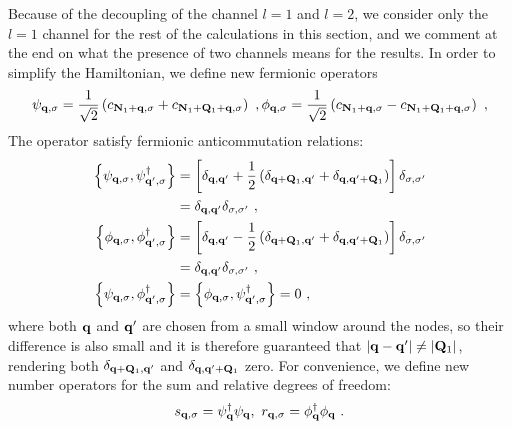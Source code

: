 \documentclass[reprint,hidelinks,onecolumn]{revtex4-2}
\begin{document}
Because of the decoupling of the channel \(l=1\) and \(l=2\), we consider only the \(l=1\) channel for the rest of the calculations in this section, and we comment at the end on what the presence of two channels means for the results. In order to simplify the Hamiltonian, we define new fermionic operators
\begin{equation}\begin{aligned}
	\psi_{{\bf q}, \sigma} = \frac{1}{\sqrt 2}\left(c_{{\bf N}_1 + {\bf q},\sigma} + c_{{\bf N}_1 + {\bf Q}_1 + {\bf q}, \sigma}\right)~,
	\phi_{{\bf q}, \sigma} = \frac{1}{\sqrt 2}\left(c_{{\bf N}_1 + {\bf q},\sigma} - c_{{\bf N}_1 + {\bf Q}_1 + {\bf q}, \sigma}\right)~,
\end{aligned}\end{equation}
The operator satisfy fermionic anticommutation relations:
\begin{equation}\begin{aligned}
	\left\{ \psi_{{\bf q},\sigma}, {\psi}^\dagger_{{\bf q}^\prime,\sigma} \right\} &= \left[\delta_{{\bf q}, {\bf q}^\prime} + \frac{1}{2}\left(\delta_{{\bf q} + {\bf Q}_1, {\bf q}^\prime} + \delta_{{\bf q}, {\bf q}^\prime + {\bf Q}_1}\right)  \right] \delta_{\sigma,\sigma^\prime} \\
																							   &= \delta_{{\bf q}, {\bf q}^\prime}\delta_{\sigma,\sigma^\prime}~,\\
	\left\{ \phi_{{\bf q},\sigma}, {\phi}^\dagger_{{\bf q}^\prime,\sigma} \right\} &= \left[\delta_{{\bf q}, {\bf q}^\prime} - \frac{1}{2}\left(\delta_{{\bf q} + {\bf Q}_1, {\bf q}^\prime} + \delta_{{\bf q}, {\bf q}^\prime + {\bf Q}_1}\right)  \right] \delta_{\sigma,\sigma^\prime} \\
																				  &= \delta_{{\bf q}, {\bf q}^\prime}\delta_{\sigma,\sigma^\prime}~,\\
	\left\{ \psi_{{\bf q},\sigma}, {\phi}^\dagger_{{\bf q}^\prime,\sigma} \right\} &= \left\{ \phi_{{\bf q},\sigma}, {\psi}^\dagger_{{\bf q}^\prime,\sigma} \right\} = 0~,
\end{aligned}\end{equation}
where both \({\bf q}\) and \({\bf q}^\prime\) are chosen from a small window around the nodes, so their difference is also small and it is therefore guaranteed that \(|{\bf q} - {\bf q}^\prime| \neq |{\bf Q}_1|\), rendering both \(\delta_{{\bf q} + {\bf Q}_1, {\bf q}^\prime}\) and \(\delta_{{\bf q}, {\bf q}^\prime + {\bf Q}_1}\) zero. For convenience, we define new number operators for the sum and relative degrees of freedom:
\begin{equation}\begin{aligned}
	s_{{\bf q},\sigma} = {\psi}^\dagger_{{\bf q}} {\psi}_{{\bf q}},~ r_{{\bf q},\sigma} = {\phi}^\dagger_{{\bf q}} {\phi}_{{\bf q}}~.
\end{aligned}\end{equation}
\end{document}
